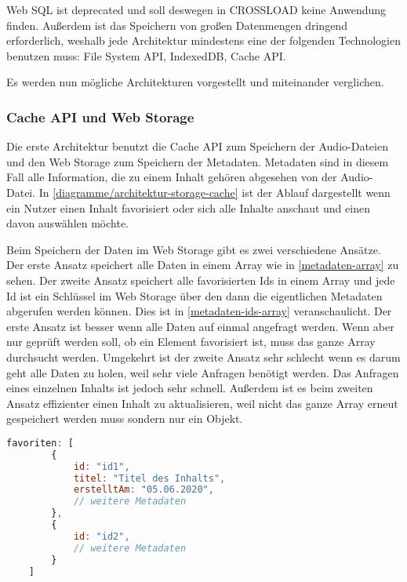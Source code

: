 Web SQL ist deprecated und soll deswegen in CROSSLOAD keine Anwendung finden. Außerdem ist das Speichern von großen Datenmengen dringend erforderlich, weshalb jede Architektur mindestens eine der folgenden Technologien benutzen muss: File System \ac{API}, IndexedDB, Cache \ac{API}.

Es werden nun mögliche Architekturen vorgestellt und miteinander verglichen. 

\subsubsection{Cache API und Web Storage}
Die erste Architektur benutzt die Cache \ac{API} zum Speichern der Audio-Dateien und den Web Storage zum Speichern der Metadaten. Metadaten sind in diesem Fall alle Information, die zu einem Inhalt gehören abgesehen von der Audio-Datei. In \autoref{diagramme/architektur-storage-cache} ist der Ablauf dargestellt wenn ein Nutzer einen Inhalt favorisiert oder sich alle Inhalte anschaut und einen davon auswählen möchte. 


Beim Speichern der Daten im Web Storage gibt es zwei verschiedene Ansätze. Der erste Ansatz speichert alle Daten in einem Array wie in \autoref{metadaten-array} zu sehen. Der zweite Ansatz speichert alle favorisierten Ids in einem Array und jede Id ist ein Schlüssel im Web Storage über den dann die eigentlichen Metadaten abgerufen werden können. Dies ist in \autoref{metadaten-ids-array} veranschaulicht.
Der erste Ansatz ist besser wenn alle Daten auf einmal angefragt werden. Wenn aber nur geprüft werden soll, ob ein Element favorisiert ist, muss das ganze Array durchsucht werden. Umgekehrt ist der zweite Ansatz sehr schlecht wenn es darum geht alle Daten zu holen, weil sehr viele Anfragen benötigt werden. Das Anfragen eines einzelnen Inhalts ist jedoch sehr schnell. Außerdem ist es beim zweiten Ansatz effizienter einen Inhalt zu aktualisieren, weil nicht das ganze Array erneut gespeichert werden muss sondern nur ein Objekt.

\clearpage

\begin{lstlisting}[language=JavaScript,caption={Speichern der Metadaten in einem Array},label={metadaten-array}]
    favoriten: [
    	{
    		id: "id1",
    		titel: "Titel des Inhalts",
    		erstelltAm: "05.06.2020",
    		// weitere Metadaten
    	},
    	{
    		id: "id2",
    		// weitere Metadaten
    	}
    ]
\end{lstlisting}

